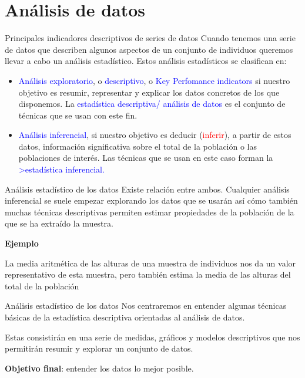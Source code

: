 \documentclass[
  ignorenonframetext,
]{beamer}
\newcommand\blue[1]{\textcolor{blue}{#1}}
\newcommand\red[1]{\textcolor{red}{#1}}
\begin{document}
\section{Análisis de datos}\label{anuxe1lisis-de-datos}

\begin{frame}{Principales indicadores descriptivos de series de datos}
\label{principales-indicadores-descriptivos-de-series-de-datos}
Cuando tenemos una serie de datos que describen algunos aspectos de un
conjunto de individuos queremos llevar a cabo un análisis estadístico.
Estos análisis estadísticos se clasifican en:

\begin{itemize}
\item
  \blue{Análisis exploratorio}, o \blue{descriptivo}, o
  \blue{Key Perfomance indicators} si nuestro objetivo es resumir,
  representar y explicar los datos concretos de los que disponemos. La
  \blue{estadística descriptiva/ análisis de datos} es el conjunto de
  técnicas que se usan con este fin.
\item
  \blue{Análisis inferencial}, si nuestro objetivo es deducir
  (\red{inferir}), a partir de estos datos, información significativa
  sobre el total de la población o las poblaciones de interés. Las
  técnicas que se usan en este caso forman la
  \blue{>estadística inferencial.}
\end{itemize}
\end{frame}

\begin{frame}{Análisis estadístico de los datos}
\label{anuxe1lisis-estaduxedstico-de-los-datos}
Existe relación entre ambos. Cualquier análisis inferencial se suele
empezar explorando los datos que se usarán así cómo también muchas
técnicas descriptivas permiten estimar propiedades de la población de la
que se ha extraído la muestra.

\textbf{Ejemplo}

La media aritmética de las alturas de una muestra de individuos nos da
un valor representativo de esta muestra, pero también estima la media de
las alturas del total de la población
\end{frame}

\begin{frame}{Análisis estadístico de los datos}
\label{anuxe1lisis-estaduxedstico-de-los-datos-1}
Nos centraremos en entender algunas técnicas básicas de la estadística
descriptiva orientadas al análisis de datos.

Estas consistirán en una serie de medidas, gráficos y modelos
descriptivos que nos permitirán resumir y explorar un conjunto de datos.

\textbf{Objetivo final}: entender los datos lo mejor posible.
\end{frame}
\end{document}

